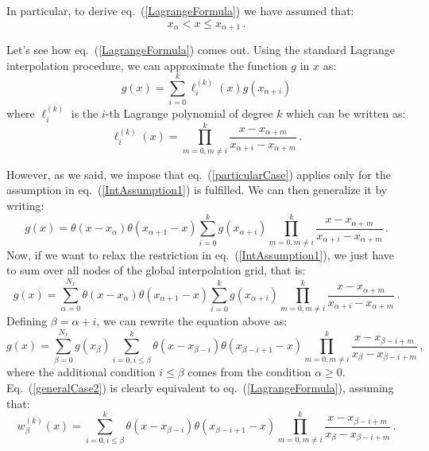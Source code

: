 \documentclass[10pt,a4paper]{article}
\begin{document}
In particular, to derive eq.~(\ref{LagrangeFormula}) we have assumed
that:
\begin{equation}
x_\alpha < x \leq x_{\alpha+1}\,.
\label{IntAssumption1}
\end{equation}

Let's see how eq.~(\ref{LagrangeFormula}) comes out. Using the
standard Lagrange interpolation procedure, we can approximate the
function $g$ in $x$ as:
\begin{equation}
g(x) = \sum_{i=0}^k\ell_i^{(k)}(x)g(x_{\alpha+i})
\label{particularCase}
\end{equation}
where $\ell_i^{(k)}$ is the $i$-th Lagrange polynomial of degree $k$
which can be written as:
\begin{equation}
\ell_i^{(k)}(x) = \prod^{k}_{m=0,m\ne i}\frac{x-x_{\alpha+m}}{x_{\alpha+i}-x_{\alpha+m}}\,.
\end{equation}

However, as we said, we impose that eq.~(\ref{particularCase}) applies
only for the assumption in eq.~(\ref{IntAssumption1}) is fulfilled. We
can then generalize it by writing:
\begin{equation}
g(x) = \theta(x-x_{\alpha})\theta(x_{\alpha+1}-x)\sum_{i=0}^k
g(x_{\alpha+i})\prod^{k}_{m=0,m\ne
  i}\frac{x-x_{\alpha+m}}{x_{\alpha+i}-x_{\alpha+m}}\,.
\label{particularCaseTheta}
\end{equation}
Now, if we want to relax the restriction in eq.~(\ref{IntAssumption1}), we just have to sum over all nodes of the global interpolation grid, that is:
\begin{equation}
g(x) =
\sum_{\alpha=0}^{N_x}\theta(x-x_{\alpha})\theta(x_{\alpha+1}-x)\sum_{i=0}^k
g(x_{\alpha+i})\prod^{k}_{m=0,m\ne
  i}\frac{x-x_{\alpha+m}}{x_{\alpha+i}-x_{\alpha+m}}\,.
\label{generalCase}
\end{equation}
Defining $\beta=\alpha+i$, we can rewrite the equation above as:
\begin{equation}
g(x) = \sum_{\beta=0}^{N_x}g(x_{\beta}) \sum_{i=0,i\leq\beta}^k
\theta(x-x_{\beta-i})\theta(x_{\beta-i+1}-x) \prod^{k}_{m=0,m\ne
  i}\frac{x-x_{\beta-i+m}}{x_{\beta}-x_{\beta-i+m}}\,,
\label{generalCase2}
\end{equation}
where the additional condition $i\leq\beta$ comes from the condition
$\alpha\geq 0$. Eq.~(\ref{generalCase2}) is clearly equivalent to
eq.~(\ref{LagrangeFormula}), assuming that:
\begin{equation}
w_\beta^{(k)}(x) = \sum_{i=0,i\leq\beta}^k \theta(x-x_{\beta-i})\theta(x_{\beta-i+1}-x) \prod^{k}_{m=0,m\ne i}\frac{x-x_{\beta-i+m}}{x_{\beta}-x_{\beta-i+m}}\,.
\end{equation}
\end{document}
